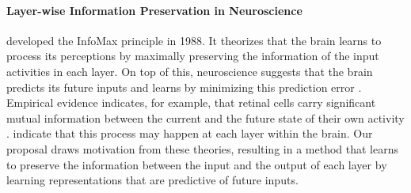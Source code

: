 \documentclass{article}
\begin{document}
\paragraph{Layer-wise Information Preservation in Neuroscience}
\citet{linsker1988self} developed the InfoMax principle in 1988. It theorizes that the brain learns to process its perceptions by maximally preserving the information of the input activities in each layer. On top of this, neuroscience suggests that the brain predicts its future inputs and learns by minimizing this prediction error \citep{friston2010free}. Empirical evidence indicates, for example, that retinal cells carry significant mutual information between the current and the future state of their own activity \citep{palmer2015predictive}. \citet{rao1999predictive} indicate that this process may happen at each layer within the brain. Our proposal draws motivation from these theories, resulting in a method that learns to preserve the information between the input and the output of each layer by learning representations that are predictive of future inputs.
\end{document}
